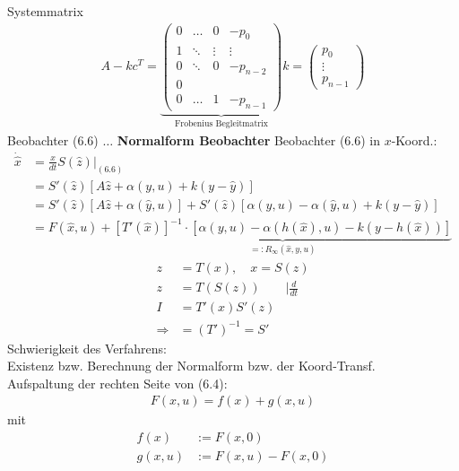 \documentclass[ngerman]{tudscrreprt}
\begin{document}
Systemmatrix \begin{align*}
A - kc^T = \underbrace{\begin{pmatrix}
0 & \dots & 0 & -p_0\\ 
1 & \ddots&\vdots& \vdots\\ 
0 & \ddots& 0&-p_{n-2}\\ 
0&&&\\ 
0&\dots&1&-p_{n-1}
\end{pmatrix}}_{\text{Frobenius Begleitmatrix}}
k = \begin{pmatrix}
p_0\\ \vdots\\ p_{n-1}
\end{pmatrix}
\end{align*}
Beobachter (6.6) $\dots$ \textbf{Normalform Beobachter}
Beobachter (6.6) in $x$-Koord.: \begin{align*}
\dot{\hat x} &= \frac{x}{dt}S(\hat z)|_{(6.6)} \\ 
&= S'(\hat z)[ A\hat z + \alpha(y,u) + k(y- \hat y) ]\\ 
&= S'(\hat z)[ A\hat z + \alpha(\hat y,u)] + S'(\hat z)[\alpha(y,u) - \alpha(\hat y,u) + k(y- \hat y)]\\ 
&= F(\hat x,u) + \underbrace{[T'(\hat x)]^{-1}\cdot[\alpha(y,u) - \alpha(h(\hat x),u) - k(y- h(\hat x))]}_{=: R_{\infty} (\hat x, y,u)}
\end{align*}
\begin{align*}
z &= T(x), \quad x = S(z)\\ 
z &= T(S(z))\qquad|\frac{d}{dt}\\
I &= T'(x)S'(z)\\ 
\Rightarrow &= (T')^{-1} = S' 
\end{align*}
Schwierigkeit des Verfahrens: \\ 
Existenz bzw. Berechnung der Normalform bzw. der Koord-Transf.\\ 
Aufspaltung der rechten Seite von (6.4): \begin{align*}
F(x,u) = f(x) + g(x,u) \tag{6.8}
\end{align*}
mit \begin{align*}
f(x)&:= F(x,0)\\ 
g(x,u)&:= F(x,u) - F(x,0)
\end{align*}
\end{document}
